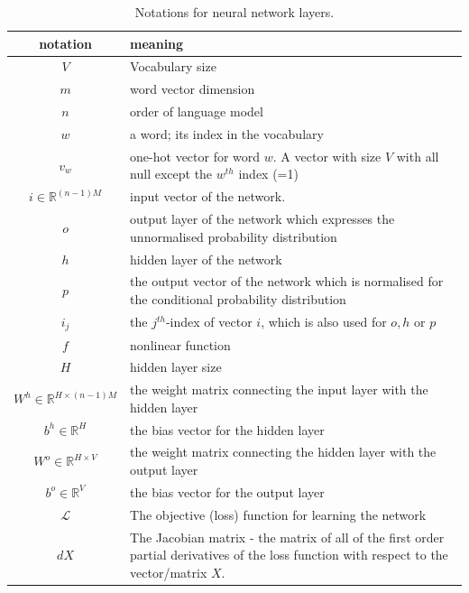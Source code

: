 \begin{table}
	\centering
	\begin{tabular}{|c|p{10cm}|}
		\hline
		notation & meaning \\
		\hline
		$V$ & Vocabulary size \\
		$m$ & word vector dimension \\
		$n$ & order of language model \\
		$w$ & a word; its index in the vocabulary \\
		$v_w$ & one-hot vector for word $w$. A vector with size $V$ with all null except the $w^{th}$ index (=1) \\
		\hline
		$i \in \mathbb{R}^{(n-1)M}$ & input vector of the network. \\
		$o$ & output layer of the network which expresses the \newline unnormalised probability distribution \\
		$h$ & hidden layer of the network \\
		$p$ & the output vector of the network which is normalised for the \newline conditional probability distribution \\
		$i_j$ & the $j^{th}$-index of vector $i$, which is also used for $o, h \text{ or } p$ \\
		\hline
		$f$ & nonlinear function \\
		$H$ & hidden layer size \\
		$W^h \in \mathbb{R}^{H \times (n-1)M}$ & the weight matrix connecting \newline the input layer with the hidden layer \\
		$b^h \in \mathbb{R}^H$ & the bias vector for the hidden layer \\
		\hline 
		$W^o \in \mathbb{R}^{H \times V}$ & the weight matrix connecting \newline the hidden layer with the output layer \\
		$b^o \in \mathbb{R}^V$ & the bias vector for the output layer \\
		\hline
		$\mathcal{L}$ & The objective (loss) function for learning the network \\
		$dX$ & The Jacobian matrix - the matrix of all of the first order partial derivatives of the loss function with respect to the vector/matrix $X$. \\
		\hline
	\end{tabular}
	\label{tab:notationFFNN}
	\caption{Notations for neural network layers.}
\end{table}

